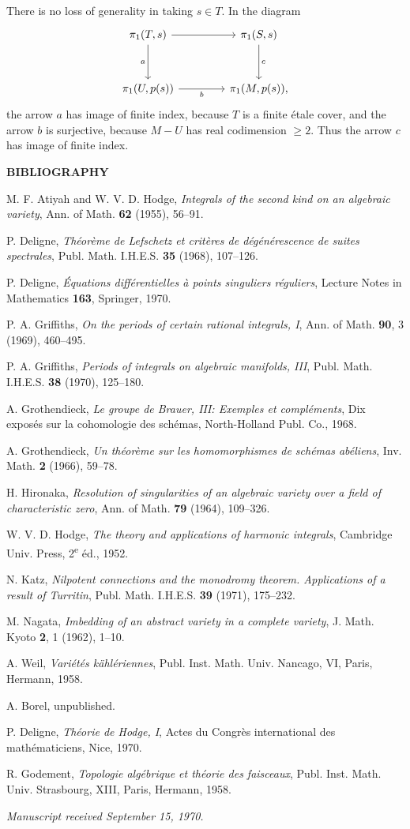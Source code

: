 \documentclass[10pt]{article}
\begin{document}
There is no loss of generality in taking $s\in T$. In the diagram
\[
\begin{tikzcd}[column sep=4.2em,row sep=3.2em]
\pi_1(T,s) \arrow[r] \arrow[d,"a"'] & \pi_1(S,s) \arrow[d,"c"]\\
\pi_1(U,p(s)) \arrow[r,"b"'] & \pi_1(M,p(s)),
\end{tikzcd}
\]
the arrow $a$ has image of finite index, because $T$ is a finite étale cover, and the arrow $b$ is surjective, because $M-U$ has real codimension $\ge2$. Thus the arrow $c$ has image of finite index.

\begin{center}
\bfseries BIBLIOGRAPHY
\end{center}

\begin{enumerate}[label={[\arabic*]},leftmargin=2.8em]
\item M. F. Atiyah and W. V. D. Hodge, \emph{Integrals of the second kind on an algebraic variety}, Ann. of Math. \textbf{62} (1955), 56--91.
\item P. Deligne, \emph{Théorème de Lefschetz et critères de dégénérescence de suites spectrales}, Publ. Math. I.H.E.S. \textbf{35} (1968), 107--126.
\item P. Deligne, \emph{Équations différentielles à points singuliers réguliers}, Lecture Notes in Mathematics \textbf{163}, Springer, 1970.
\item P. A. Griffiths, \emph{On the periods of certain rational integrals, I}, Ann. of Math. \textbf{90}, 3 (1969), 460--495.
\item P. A. Griffiths, \emph{Periods of integrals on algebraic manifolds, III}, Publ. Math. I.H.E.S. \textbf{38} (1970), 125--180.
\item A. Grothendieck, \emph{Le groupe de Brauer, III: Exemples et compléments}, Dix exposés sur la cohomologie des schémas, North-Holland Publ. Co., 1968.
\item A. Grothendieck, \emph{Un théorème sur les homomorphismes de schémas abéliens}, Inv. Math. \textbf{2} (1966), 59--78.
\item H. Hironaka, \emph{Resolution of singularities of an algebraic variety over a field of characteristic zero}, Ann. of Math. \textbf{79} (1964), 109--326.
\item W. V. D. Hodge, \emph{The theory and applications of harmonic integrals}, Cambridge Univ. Press, 2\textsuperscript{e} éd., 1952.
\item N. Katz, \emph{Nilpotent connections and the monodromy theorem. Applications of a result of Turritin}, Publ. Math. I.H.E.S. \textbf{39} (1971), 175--232.
\item M. Nagata, \emph{Imbedding of an abstract variety in a complete variety}, J. Math. Kyoto \textbf{2}, 1 (1962), 1--10.
\item A. Weil, \emph{Variétés kählériennes}, Publ. Inst. Math. Univ. Nancago, VI, Paris, Hermann, 1958.
\item A. Borel, unpublished.
\item P. Deligne, \emph{Théorie de Hodge, I}, Actes du Congrès international des mathématiciens, Nice, 1970.
\end{enumerate}

\noindent[TF]\quad R. Godement, \emph{Topologie algébrique et théorie des faisceaux}, Publ. Inst. Math. Univ. Strasbourg, XIII, Paris, Hermann, 1958.

\begin{center}
\emph{Manuscript received September 15, 1970.}
\end{center}
\end{document}
